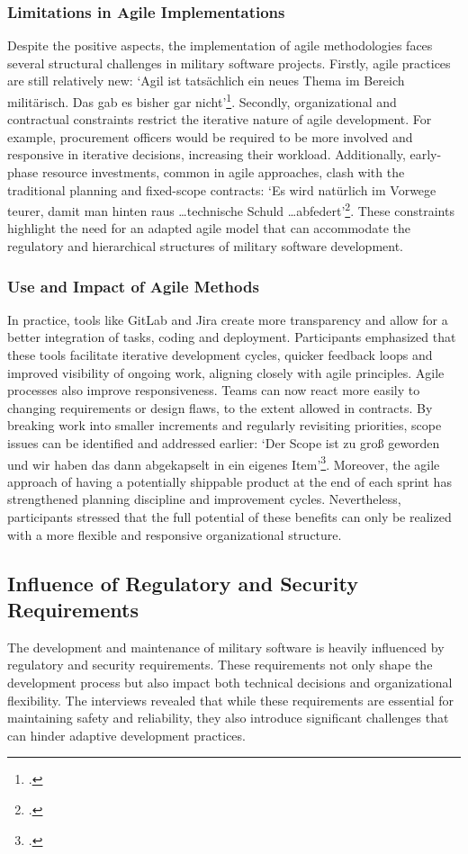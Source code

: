 \subsubsection{Limitations in Agile Implementations}
Despite the positive aspects, the implementation of agile methodologies faces several structural challenges in military software projects. Firstly, agile practices are still relatively new: `Agil ist tatsächlich ein neues Thema im Bereich militärisch. Das gab es bisher gar nicht'\footcite{Interview12025}.
Secondly, organizational and contractual constraints restrict the iterative nature of agile development. For example, procurement officers would be required to be more involved and responsive in iterative decisions, increasing their workload. Additionally, early-phase resource investments, common in agile approaches,
clash with the traditional planning and fixed-scope contracts: `Es wird natürlich im Vorwege teurer, damit man hinten raus \ldots technische Schuld \ldots abfedert'\footcite{Interview12025}. These constraints highlight the need for an adapted agile model that can accommodate the regulatory and hierarchical structures of military software development.

\subsubsection{Use and Impact of Agile Methods}
In practice, tools like GitLab and Jira create more transparency and allow for a better integration of tasks, coding and deployment. Participants emphasized that these tools facilitate iterative development cycles, quicker feedback loops and 
improved visibility of ongoing work, aligning closely with agile principles. 
Agile processes also improve responsiveness. Teams can now react more easily to changing requirements or design flaws, to the extent allowed in contracts. By breaking work into smaller increments and regularly revisiting priorities, scope issues can be identified and addressed earlier:
`Der Scope ist zu groß geworden und wir haben das dann abgekapselt in ein eigenes Item'\footcite{Interview32025}. Moreover, the agile approach of having a potentially shippable product at the end of each sprint has strengthened planning discipline and improvement cycles.
Nevertheless, participants stressed that the full potential of these benefits can only be realized with a more flexible and responsive organizational structure.

\subsection{Influence of Regulatory and Security Requirements}
The development and maintenance of military software is heavily influenced by regulatory and security requirements. These requirements not only shape the development process but also impact both technical decisions and organizational flexibility.
The interviews revealed that while these requirements are essential for maintaining safety and reliability, they also introduce significant challenges that can hinder adaptive development practices.

